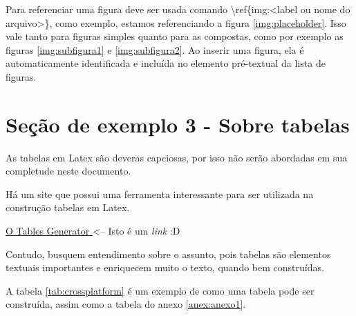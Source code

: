 
Para referenciar uma figura deve ser usada comando \textbackslash ref\{img:<label ou nome do arquivo>\}, como exemplo, estamos referenciando a figura \ref{img:placeholder}. Isso vale tanto para figuras simples quanto para as compostas, como por exemplo as figuras \ref{img:subfigura1} e \ref{img:subfigura2}. Ao inserir uma figura, ela é automaticamente identificada e incluída no elemento pré-textual da lista de figuras.




\section{Seção de exemplo 3 - Sobre tabelas}

As tabelas em Latex são deveras capciosas, por isso não serão abordadas em sua completude neste documento.

Há um site que possui uma ferramenta interessante para ser utilizada na construção tabelas em Latex.

\centerline{\href{https://www.tablesgenerator.com/}{ O Tables Generator } <-- Isto é um \textit{link} :D}

Contudo, busquem entendimento sobre o assunto, pois tabelas são elementos textuais importantes e enriquecem muito o texto, quando bem construídas.

A tabela \ref{tab:crossplatform} é um exemplo de como uma tabela pode ser construída, assim como a tabela do anexo \ref{anex:anexo1}.
   
